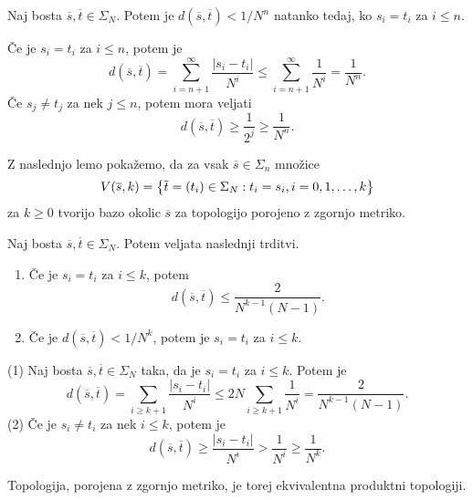 \begin{izrek} \label{thm:blizu}
    Naj bosta \(\overline{s}, \overline{t} \in \Sigma_N\). Potem je \(d(\overline{s}, \overline{t}) < 1/N^n\) natanko tedaj, ko \(s_i = t_i\) za \(i \leq n\).
\end{izrek}

\begin{dokaz}
    Če je \(s_i = t_i\) za \(i \leq n\), potem je
    \[d(\overline{s}, \overline{t}) = \sum_{i = n + 1}^{\infty} \frac{|s_i - t_i|}{N^i} \leq \sum_{i = n + 1}^{\infty} \frac{1}{N^i} = \frac{1}{N^n}.\]
    Če \(s_j \neq t_j\) za nek \(j \leq n\), potem mora veljati
    \[d(\overline{s}, \overline{t}) \geq \frac{1}{2^j} \geq \frac{1}{N^n}.\]
\end{dokaz}

Z naslednjo lemo pokažemo, da za vsak \(\overline{s} \in \Sigma_n\) množice
\[V(\overline{s}, k) = \left\{ \overline{t} = (t_i) \in \Sigma_N : t_i = s_i, i = 0, 1, \dots, k \right\}\]
za \(k \geq 0\) tvorijo bazo okolic \(\overline{s}\) za topologijo porojeno z zgornjo metriko.

\begin{lema} \label{lem:seq-metric}
    Naj bosta \(\overline{s}, \overline{t} \in \Sigma_N\). Potem veljata naslednji trditvi.
    \begin{enumerate}[label=(\arabic*)]
        \item Če je \(s_i = t_i\) za \(i \leq k\), potem \[d (\overline{s}, \overline{t}) \leq \frac{2}{N^{k - 1} (N - 1)}.\]
        \item Če je \(d (\overline{s}, \overline{t}) < 1 / N^k\), potem je \(s_i = t_i\) za \(i \leq k\).
    \end{enumerate}
\end{lema}

\begin{dokaz}
    (1) Naj bosta \(\overline{s}, \overline{t} \in \Sigma_N\) taka, da je \(s_i = t_i\) za \(i \leq k\). Potem je
    \[d (\overline{s}, \overline{t}) = \sum_{i \geq k + 1} \frac{|s_i - t_i|}{N^i} \leq 2 N \sum_{i \geq k + 1} \frac{1}{N^i} = \frac{2}{N^{k - 1} (N - 1)}.\]
    (2) Če je \(s_i \neq t_i\) za nek \(i \leq k\), potem je
    \[d (\overline{s}, \overline{t}) \geq \frac{|s_i - t_i|}{N^i} > \frac{1}{N^i} \geq \frac{1}{N^k}.\]
\end{dokaz}

\noindent Topologija, porojena z zgornjo metriko, je torej ekvivalentna produktni topologiji.


